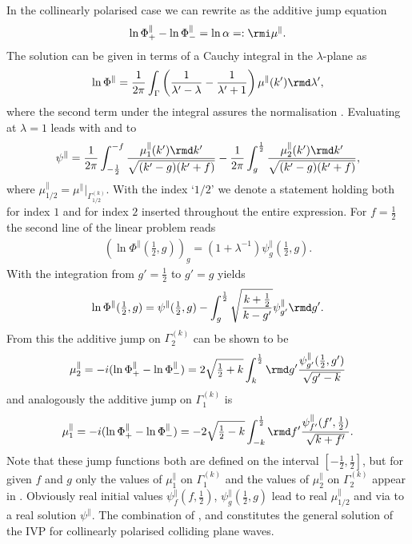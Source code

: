 \documentclass[12pt]{iopart}
\begin{document}
In the collinearly polarised case we can rewrite  as the additive jump equation
\begin{eqnarray} \label{SprungAdd}
\ln{\Phi}^\|_+-\ln{\Phi}^\|_-=\ln\alpha=:\rmi\mu^\|.
\end{eqnarray}
The solution can be given in terms of a Cauchy integral in the $\lambda$-plane as
\begin{eqnarray} \label{lnPhi}
\ln{\Phi}^\|=\frac{1}{2\pi}\int_{\Gamma}\left(\frac{1}{\lambda'-\lambda}-\frac{1}{\lambda'+1}\right)\mu^\|(k')\rmd\lambda',
\end{eqnarray}
where the second term under the integral assures  the normalisation .
Evaluating  at $\lambda=1$ leads with  and  to 
\begin{eqnarray} \label{psiLineInt}
\psi^\|=\frac{1}{2\pi}\int_{-\frac12}^{-f}\frac{\mu^\|_1(k')\rmd k'}{\sqrt{(k'-g)(k'+f)}}
     -\frac{1}{2\pi}\int_{g}^{\frac12}\frac{\mu^\|_2(k')\rmd k'}{\sqrt{(k'-g)(k'+f)}},
\end{eqnarray}
where $\mu^\|_{1/2}=\mu^\||_{\Gamma_{1/2}^{(k)}}$. With the index `$1/2$' we denote a statement holding both for index $1$ and for index $2$ inserted throughout the entire expression. For $f=\frac12$ the second line of the linear problem  reads
\begin{eqnarray} \label{LPfeinhalb}
\left(\ln\Phi^\|\left(\mbox{$\frac12$},g\right)\right)_g=(1+\lambda^{-1})\psi^\|_g\left(\mbox{$\frac12$},g\right).
\end{eqnarray}
With  the integration from $g'=\frac12$ to $g'=g$ yields
\begin{eqnarray} \label{fgleicheinhalb}
\ln\Phi^\|(\mbox{$\frac12$},g)
   =\psi^\|(\mbox{$\frac12$},g)-\int_g^{\frac12}\sqrt{\frac{k+\frac12}{k-g'}}\psi^\|_{g'}\rmd g'.
\end{eqnarray}
From this the additive jump on $\Gamma^{(k)}_2$ can be shown to be
\begin{eqnarray} \label{mu2}
\mu^\|_2=-i(\ln\Phi^\|_+-\ln\Phi^\|_-)=2\sqrt{\mbox{$\frac12$}+k}\int_{k}^{\frac12}\rmd g'\frac{\psi^\|_{g'}(\frac12,g')}{\sqrt{g'-k}}
\end{eqnarray}
and analogously the additive jump on $\Gamma^{(k)}_1$ is
\begin{eqnarray} \label{mu1}
\mu^\|_1=-i(\ln\Phi^\|_+-\ln\Phi^\|_-)=-2\sqrt{\mbox{$\frac12$}-k}\int_{-k}^{\frac12}\rmd f'\frac{\psi^\|_{f'}(f',\frac12)}{\sqrt{k+f'}}.
\end{eqnarray}
Note that these jump functions both are defined on the interval $[-\frac12,\frac12]$, but for given $f$ and $g$ only the values of $\mu^\|_{1}$ on $\Gamma^{(k)}_1$ and the values of $\mu^\|_{2}$ on $\Gamma^{(k)}_2$ appear in . Obviously real initial values $\psi^\|_{f}(f,\frac12)$, $\psi^\|_{g}(\frac12,g)$ lead to real $\mu^\|_{1/2}$ and via  to a real solution $\psi^\|$. The combination of ,  and  constitutes the general solution of the IVP for collinearly polarised colliding plane waves. 
\end{document}
